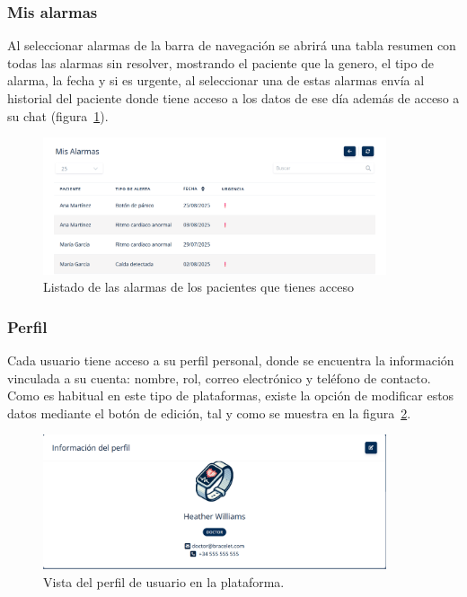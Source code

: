 \documentclass[12pt, a4paper]{article}
\begin{document}
\begin{umaappendices}
	\subsubsection{Mis alarmas}
	Al seleccionar alarmas de la barra de navegación se abrirá una tabla resumen con todas las alarmas sin resolver, mostrando el paciente que la genero, el tipo de alarma, la fecha y si es urgente, al seleccionar una de estas alarmas envía al historial del paciente donde tiene acceso a los datos de ese día además de acceso a su chat (figura~\ref{fig:alarn}).
	
	\begin{figure}[htbp]
		\centering
		\includegraphics[width=0.9\textwidth]{images/12_alarmas.png}
		\caption[Ejemplo]{Listado de las alarmas de los pacientes que tienes acceso}
		\label{fig:alarn}
	\end{figure}

	
	\subsubsection{Perfil}
	Cada usuario tiene acceso a su perfil personal, donde se encuentra la información vinculada a su cuenta: nombre, rol, correo electrónico y teléfono de contacto. Como es habitual en este tipo de plataformas, existe la opción de modificar estos datos mediante el botón de edición, tal y como se muestra en la figura~\ref{fig:per}.
	
	\begin{figure}[htbp]
		\centering
		\includegraphics[width=0.9\textwidth]{images/13_perfil.png}
		\caption[Ejemplo]{Vista del perfil de usuario en la plataforma.}
		\label{fig:per}
	\end{figure}
	

\end{umaappendices}
\end{document}
